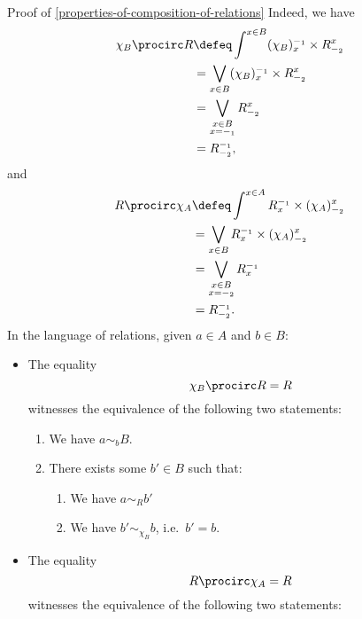 \begin{Proof}{Proof of \cref{properties-of-composition-of-relations}}
    Indeed, we have
    \begin{align*}
        \chi_{B}\procirc R &\defeq \int^{x\in B}(\chi_{B})^{-_{1}}_{x}\times R^{x}_{-_{2}}\\
                           &=      \bigvee_{x\in B}(\chi_{B})^{-_{1}}_{x}\times R^{x}_{-_{2}}\\
                           &=      \bigvee_{\substack{x\in B\\x=-_{1}}}R^{x}_{-_{2}}\\
                           &=      R^{-_{1}}_{-_{2}},
    \end{align*}
    and
    \begin{align*}
        R\procirc\chi_{A} &\defeq \int^{x\in A}R^{-_{1}}_{x}\times(\chi_{A})^{x}_{-_{2}}\\
                          &=      \bigvee_{x\in B}R^{-_{1}}_{x}\times(\chi_{A})^{x}_{-_{2}}\\
                          &=      \bigvee_{\substack{x\in B\\x=-_{2}}}R^{-_{1}}_{x}\\
                          &=      R^{-_{1}}_{-_{2}}.
    \end{align*}
    In the language of relations, given $a\in A$ and $b\in B$:
    \begin{itemize}
        \item The equality
            \[
                \chi_{B}\procirc R%
                =%
                R%
            \]%
            witnesses the equivalence of the following two statements:
            \begin{enumerate}
                \item We have $a\sim_{b}B$.
                \item There exists some $b'\in B$ such that:
                    \begin{enumerate}
                        \item We have $a\sim_{R}b'$
                        \item We have $b'\sim_{\chi_{B}}b$, i.e.\ $b'=b$.
                    \end{enumerate}
            \end{enumerate}
        \item The equality
            \[
                R\procirc\chi_{A}%
                =%
                R%
            \]%
            witnesses the equivalence of the following two statements:

\end{itemize}
\end{Proof}
